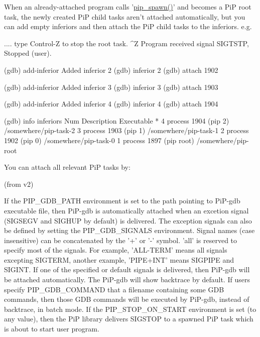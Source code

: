 When an already-\/attached program calls '\hyperlink{group__PiP-1-spawn_gae9187ea22ecf0623fa3ecfba5337f52d}{pip\-\_\-spawn()}' and becomes a Pi\-P root task, the newly created Pi\-P child tasks aren't attached automatically, but you can add empty inferiors and then attach the Pi\-P child tasks to the inferiors. e.\-g. \begin{DoxyVerb}.... type Control-Z to stop the root task.
^Z
Program received signal SIGTSTP, Stopped (user).

(gdb) add-inferior
Added inferior 2
(gdb) inferior 2
(gdb) attach 1902

(gdb) add-inferior
Added inferior 3
(gdb) inferior 3
(gdb) attach 1903

(gdb) add-inferior
Added inferior 4
(gdb) inferior 4
(gdb) attach 1904

(gdb) info inferiors
  Num  Description              Executable
* 4    process 1904 (pip 2)     /somewhere/pip-task-2
  3    process 1903 (pip 1)     /somewhere/pip-task-1
  2    process 1902 (pip 0)     /somewhere/pip-task-0
  1    process 1897 (pip root)  /somewhere/pip-root
\end{DoxyVerb}


You can attach all relevant Pi\-P tasks by\-: 


(from v2)

If the P\-I\-P\-\_\-\-G\-D\-B\-\_\-\-P\-A\-T\-H environment is set to the path pointing to Pi\-P-\/gdb executable file, then Pi\-P-\/gdb is automatically attached when an excetion signal (S\-I\-G\-S\-E\-G\-V and S\-I\-G\-H\-U\-P by default) is delivered. The exception signals can also be defined by setting the P\-I\-P\-\_\-\-G\-D\-B\-\_\-\-S\-I\-G\-N\-A\-L\-S environment. Signal names (case insensitive) can be concatenated by the '+' or '-\/' symbol. 'all' is reserved to specify most of the signals. For example, 'A\-L\-L-\/\-T\-E\-R\-M' means all signals excepting S\-I\-G\-T\-E\-R\-M, another example, 'P\-I\-P\-E+\-I\-N\-T' means S\-I\-G\-P\-I\-P\-E and S\-I\-G\-I\-N\-T. If one of the specified or default signals is delivered, then Pi\-P-\/gdb will be attached automatically. The Pi\-P-\/gdb will show backtrace by default. If users specify P\-I\-P\-\_\-\-G\-D\-B\-\_\-\-C\-O\-M\-M\-A\-N\-D that a filename containing some G\-D\-B commands, then those G\-D\-B commands will be executed by Pi\-P-\/gdb, instead of backtrace, in batch mode. If the P\-I\-P\-\_\-\-S\-T\-O\-P\-\_\-\-O\-N\-\_\-\-S\-T\-A\-R\-T environment is set (to any value), then the Pi\-P library delivers S\-I\-G\-S\-T\-O\-P to a spawned Pi\-P task which is about to start user program.

